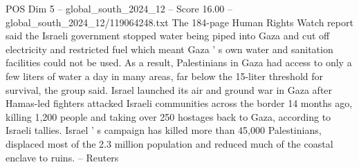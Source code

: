 \begin{textsample}{POS Dim 5 – global\_south\_2024\_12 – Score 16.00 – global\_south\_2024\_12/119064248.txt}
The 184-page Human Rights Watch report said the Israeli government stopped water being piped into Gaza and cut off electricity and restricted fuel which meant Gaza ' s own water and sanitation facilities could not be used.
As a result, Palestinians in Gaza had access to only a few liters of water a day in many areas, far below the 15-liter threshold for survival, the group said.
Israel launched its air and ground war in Gaza after Hamas-led fighters attacked Israeli communities across the border 14 months ago, killing 1,200 people and taking over 250 hostages back to Gaza, according to Israeli tallies.
Israel ' s campaign has killed more than 45,000 Palestinians, displaced most of the 2.3 million population and reduced much of the coastal enclave to ruins. -- Reuters

\end{textsample}
